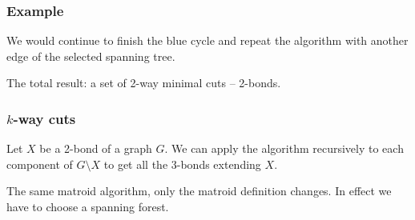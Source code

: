 \documentclass[10pt]{beamer}
\begin{document}
\begin{frame}
	\frametitle{Example}

    We would continue to finish the blue cycle and repeat the algorithm
    with another edge of the selected spanning tree.

    \bigskip

    The total result: a set of 2-way minimal cuts -- 2-bonds.
\end{frame}

\begin{frame}
	\frametitle{$k$-way cuts}

    Let $X$ be a 2-bond of a graph $G$. We can apply the algorithm
    recursively to each component of $G \setminus X$ to get all the
    3-bonds extending $X$.

    \bigskip

    The same matroid algorithm, only the matroid definition changes.
    In effect we have to choose a spanning forest.

\end{frame}
\end{document}
